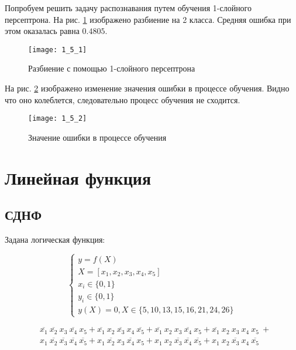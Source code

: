 
Попробуем решить задачу распознавания путем обучения 1-слойного персептрона. На рис. \ref{fig:1_5_1} изображено разбиение на 2 класса. Средняя ошибка при этом оказалась равна $0.4805$.

\begin{figure}[H]
\begin{center}
	\texttt{[image: 1\_5\_1]}
	\caption{Разбиение с помощью 1-слойного персептрона}
	\label{fig:1_5_1}
\end{center}
\end{figure}
\vspace{-0.5cm}

На рис. \ref{fig:1_5_2} изображено изменение значения ошибки в процессе обучения. Видно что оно колеблется, следовательно процесс обучения не сходится.

\vspace{-0.5cm}
\begin{figure}[H]
\begin{center}
	\texttt{[image: 1\_5\_2]}
	\caption{Значение ошибки в процессе обучения}
	\label{fig:1_5_2}
\end{center}
\end{figure}

\section{Линейная функция}

\subsection{СДНФ}

Задана логическая функция:

\begin{equation*}
\begin{cases}
	y = f(X)\\
	X = [x_1, x_2, x_3, x_4, x_5]\\
	x_i \in \{0, 1\}\\
	y_i \in \{0, 1\}\\
	y(X) = 0, X \in \{ 5, 10, 13, 15, 16, 21, 24, 26 \}
\end{cases}
\end{equation*}

\begin{align*}
&\overline{x_1}\ \overline{x_2}\ x_3\ \overline{x_4}\ x_5 +
\overline{x_1}\ x_2\ \overline{x_3}\ x_4\ \overline{x_5} +
\overline{x_1}\ x_2\ x_3\ \overline{x_4}\ x_5 +
\overline{x_1}\ x_2\ x_3\ x_4\ x_5\ + \\
&x_1\ \overline{x_2}\ \overline{x_3}\ \overline{x_4}\ \overline{x_5} +
x_1\ \overline{x_2}\ x_3\ \overline{x_4}\ x_5 +
x_1\ x_2\ \overline{x_3}\ \overline{x_4}\ \overline{x_5} +
x_1\ x_2\ \overline{x_3}\ x_4\ \overline{x_5}
\end{align*}

